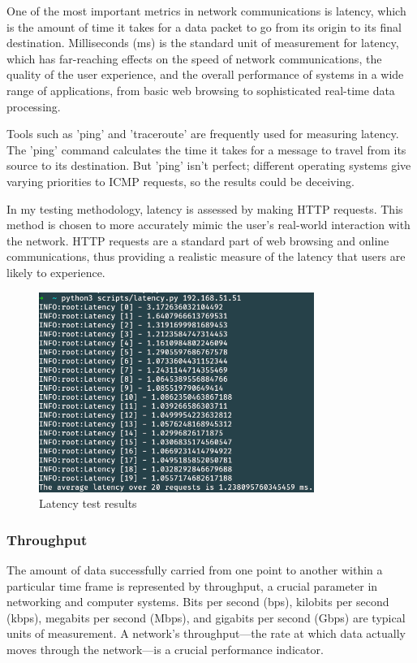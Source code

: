 \documentclass[12pt, fleqn, a4paper]{article}
\begin{document}
One of the most important metrics in network communications is latency, which is the amount of time it takes for a data packet to go from its origin to its final destination. Milliseconds (ms) is the standard unit of measurement for latency, which has far-reaching effects on the speed of network communications, the quality of the user experience, and the overall performance of systems in a wide range of applications, from basic web browsing to sophisticated real-time data processing.

Tools such as 'ping' and 'traceroute' are frequently used for measuring latency. The 'ping' command calculates the time it takes for a message to travel from its source to its destination. But 'ping' isn't perfect; different operating systems give varying priorities to ICMP requests, so the results could be deceiving. 

In my testing methodology, latency is assessed by making HTTP requests. This method is chosen to more accurately mimic the user's real-world interaction with the network. HTTP requests are a standard part of web browsing and online communications, thus providing a realistic measure of the latency that users are likely to experience.

\begin{figure}[H]
	\centering
	\includegraphics[width=0.8\textwidth]{img/latency}
	\caption{Latency test results}
  \label{fig:latency}
\end{figure}

\subsubsection{Throughput}
The amount of data successfully carried from one point to another within a particular time frame is represented by throughput, a crucial parameter in networking and computer systems. Bits per second (bps), kilobits per second (kbps), megabits per second (Mbps), and gigabits per second (Gbps) are typical units of measurement. A network's throughput—the rate at which data actually moves through the network—is a crucial performance indicator.
\end{document}
